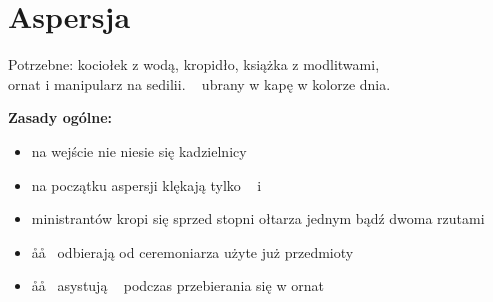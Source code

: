 \section{Aspersja}
	
		\begin{center}
			Potrzebne: kociołek z wodą, kropidło, książka z modlitwami, \\ornat i manipularz na sedilii.
			\ii~ ubrany w kapę w kolorze dnia.
		\end{center}
	
		\textbf{Zasady ogólne:}
		\begin{itemize}
			\item na wejście nie niesie się kadzielnicy
			\item na początku aspersji klękają tylko \ii~ i \cc~
			\item ministrantów kropi się sprzed stopni ołtarza jednym bądź dwoma rzutami
			\item \aa\aa~ odbierają od ceremoniarza użyte już przedmioty
			\item \aa\aa~ asystują \ii~ podczas przebierania się w ornat
		\end{itemize}
	
		\bigskip
	
